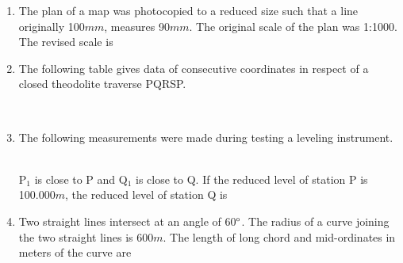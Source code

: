\documentclass[journal,12pt,onecolumn]{IEEEtran}
\theoremstyle{remark}
\begin{document}
\begin{enumerate}
\begin{enumerate}
\begin{multicols}{4}
\end{multicols}
\end{enumerate}
\item The plan of a map was photocopied to a reduced size such that a line originally 100$mm$, measures 90$mm$. The original scale of the plan was 1:1000. The revised scale is
\begin{enumerate}
\end{enumerate}
\item The following table gives data of consecutive coordinates in respect of a closed theodolite traverse PQRSP. \\
\begin{table}[h]
    \centering
    
\end{table}\\
\begin{enumerate}
\end{enumerate}
\item The following measurements were made during testing a leveling instrument.
\begin{table}[h]
    \centering
    
\end{table}\\
P$_1$ is close to P and Q$_1$ is close to Q. If the reduced level of station P is 100.000$m$, the reduced level of station Q is
\begin{enumerate}
\end{enumerate}
\item Two straight lines intersect at an angle of 60$\degree$. The radius of a curve joining the two straight lines is 600$m$. The length of long chord and mid-ordinates in meters of the curve are
\begin{enumerate}
\end{enumerate}
\end{enumerate}
\end{document}
